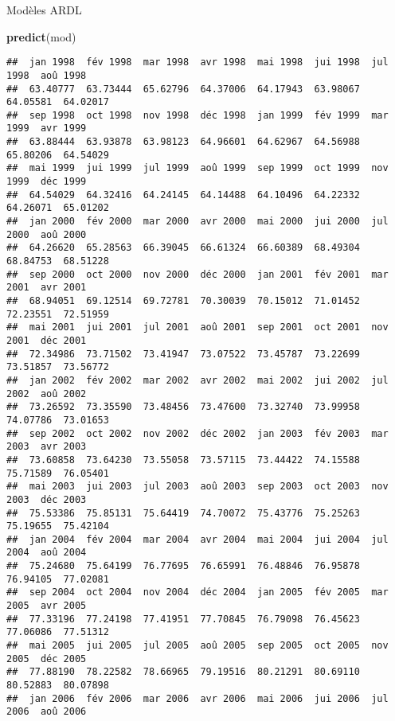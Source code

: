\documentclass[10pt,xcolor=table,color={dvipsnames,usenames},ignorenonframetext,usepdftitle=false,french]{beamer}
\newenvironment{Shaded}{\begin{snugshade}}{\end{snugshade}}
\newcommand{\KeywordTok}[1]{\textcolor[rgb]{0.13,0.29,0.53}{\textbf{#1}}}
\newcommand{\NormalTok}[1]{#1}
\begin{document}
\begin{frame}[fragile]{Modèles ARDL}
\protect\hypertarget{moduxe8les-ardl-3}{}

\begin{Shaded}
\begin{Highlighting}[]
\KeywordTok{predict}\NormalTok{(mod)}
\end{Highlighting}
\end{Shaded}

\begin{verbatim}
##  jan 1998  fév 1998  mar 1998  avr 1998  mai 1998  jui 1998  jul 1998  aoû 1998 
##  63.40777  63.73444  65.62796  64.37006  64.17943  63.98067  64.05581  64.02017 
##  sep 1998  oct 1998  nov 1998  déc 1998  jan 1999  fév 1999  mar 1999  avr 1999 
##  63.88444  63.93878  63.98123  64.96601  64.62967  64.56988  65.80206  64.54029 
##  mai 1999  jui 1999  jul 1999  aoû 1999  sep 1999  oct 1999  nov 1999  déc 1999 
##  64.54029  64.32416  64.24145  64.14488  64.10496  64.22332  64.26071  65.01202 
##  jan 2000  fév 2000  mar 2000  avr 2000  mai 2000  jui 2000  jul 2000  aoû 2000 
##  64.26620  65.28563  66.39045  66.61324  66.60389  68.49304  68.84753  68.51228 
##  sep 2000  oct 2000  nov 2000  déc 2000  jan 2001  fév 2001  mar 2001  avr 2001 
##  68.94051  69.12514  69.72781  70.30039  70.15012  71.01452  72.23551  72.51959 
##  mai 2001  jui 2001  jul 2001  aoû 2001  sep 2001  oct 2001  nov 2001  déc 2001 
##  72.34986  73.71502  73.41947  73.07522  73.45787  73.22699  73.51857  73.56772 
##  jan 2002  fév 2002  mar 2002  avr 2002  mai 2002  jui 2002  jul 2002  aoû 2002 
##  73.26592  73.35590  73.48456  73.47600  73.32740  73.99958  74.07786  73.01653 
##  sep 2002  oct 2002  nov 2002  déc 2002  jan 2003  fév 2003  mar 2003  avr 2003 
##  73.60858  73.64230  73.55058  73.57115  73.44422  74.15588  75.71589  76.05401 
##  mai 2003  jui 2003  jul 2003  aoû 2003  sep 2003  oct 2003  nov 2003  déc 2003 
##  75.53386  75.85131  75.64419  74.70072  75.43776  75.25263  75.19655  75.42104 
##  jan 2004  fév 2004  mar 2004  avr 2004  mai 2004  jui 2004  jul 2004  aoû 2004 
##  75.24680  75.64199  76.77695  76.65991  76.48846  76.95878  76.94105  77.02081 
##  sep 2004  oct 2004  nov 2004  déc 2004  jan 2005  fév 2005  mar 2005  avr 2005 
##  77.33196  77.24198  77.41951  77.70845  76.79098  76.45623  77.06086  77.51312 
##  mai 2005  jui 2005  jul 2005  aoû 2005  sep 2005  oct 2005  nov 2005  déc 2005 
##  77.88190  78.22582  78.66965  79.19516  80.21291  80.69110  80.52883  80.07898 
##  jan 2006  fév 2006  mar 2006  avr 2006  mai 2006  jui 2006  jul 2006  aoû 2006 

\end{verbatim}
\end{frame}
\end{document}

